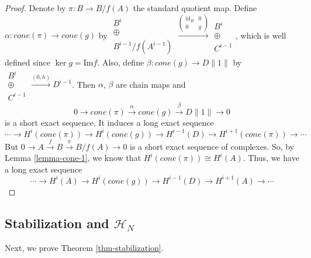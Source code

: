 \documentclass{amsart}
\theoremstyle{plain}
\theoremstyle{definition}
\theoremstyle{remark}
\numberwithin{equation}{section}
\begin{document}
\begin{proof}
Denote by $\pi:B \rightarrow B/f(A)$ the standard quotient map. Define $\alpha: cone(\pi) \rightarrow cone(g)$ by $\left.\begin{array}{c}
  B^i \\
  \oplus \\
  B^{i-1}/f(A^{i-1})
\end{array}\right.
\xrightarrow{\left(\begin{array}{cc}
 {\mathrm{id}}_B & 0 \\
  0 & g
\end{array}\right)}
\left.\begin{array}{c}
  B^{i} \\
  \oplus \\
  C^{i-1}
\end{array}\right.$, which is well defined since $\ker g ={\mathrm{Im}} f$. Also, define $\beta:cone(g) \rightarrow D\|1\|$ by $\left.\begin{array}{c}
  B^i \\
  \oplus \\
  C^{i-1}
\end{array}\right.
\xrightarrow{(0,h)}
D^{i-1}$. Then $\alpha$, $\beta$ are chain maps and 
\[
0 \rightarrow cone(\pi) \xrightarrow{\alpha} cone(g) \xrightarrow{\beta} D\|1\| \rightarrow 0
\]
is a short exact sequence. It induces a long exact sequence
\[
\cdots \rightarrow H^i(cone(\pi)) \rightarrow H^i(cone(g)) \rightarrow H^{i-1}(D) \rightarrow H^{i+1}(cone(\pi)) \rightarrow \cdots
\]
But $0 \rightarrow A \xrightarrow{f} B \xrightarrow{\pi} B/f(A) \rightarrow 0$ is a short exact sequence of complexes. So, by Lemma \ref{lemma-cone-1}, we know that $H^i(cone(\pi)) \cong H^i (A)$. Thus, we have a long exact sequence
	\[
	\cdots \rightarrow H^i(A) \rightarrow H^i(cone(g)) \rightarrow H^{i-1}(D) \rightarrow H^{i+1}(A) \rightarrow \cdots
	\]
\end{proof}

\subsection{Stabilization and ${\mathcal{H}}_N$} Next, we prove Theorem \ref{thm-stabilization}.
\end{document}
